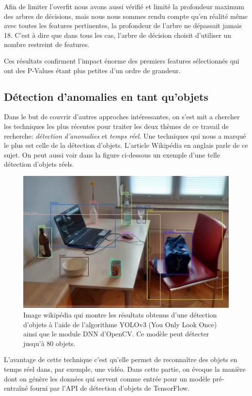 \documentclass[french]{article}
\theoremstyle{mytheoremstyle}
\theoremstyle{mytheoremstyle}
\theoremstyle{myproblemstyle}
\begin{document}
        Afin de limiter l'overfit nous avons aussi vérifié et limité la profondeur maximum des arbres de décisions, mais nous nous sommes rendu compte qu'en réalité même avec toutes les features pertinentes, la profondeur de l'arbre ne dépassait jamais 18. C'est à dire que dans tous les cas, l'arbre de décision choisit d'utiliser un nombre restreint de features.
        
        Ces résultats confirment l'impact énorme des premiers features sélectionnés qui ont des P-Values étant plus petites d'un ordre de grandeur.
    
        \subsection{Détection d'anomalies en tant qu'objets}
        Dans le but de couvrir d'autres approches intéressantes, on s'est mit a chercher les techniques les plus récentes pour traiter les deux thèmes de ce travail de recherche: \textit{détection d'anomalies} et \textit{temps réel}. Une techniques qui nous a marqué le plus est celle de la détection d'objets. L'article Wikipédia \cite{odwikipedia} en anglais parle de ce sujet. On peut aussi voir dans la figure ci-dessous un exemple d'une telle détection d'objets réels.
        \begin{figure}[H]
            \centering
            \includegraphics[width=1\textwidth]{images/real_objects.jpg}
            \caption{Image wikipédia qui montre les résultats obtenus d'une détection d'objets à l'aide de l'algorithme YOLOv3 (You Only Look Once) ainsi que le module DNN d'OpenCV. Ce modèle peut détecter jusqu'à 80 objets.}
            \label{}
        \end{figure}
        L'avantage de cette technique c'est qu'elle permet de reconnaître des objets en temps réel dans, par exemple, une vidéo. Dans cette partie, on évoque la manière dont on génère les données qui servent comme entrée pour un modèle pré-entraîné fourni par l'API de détection d'objets de TensorFlow.
\end{document}
